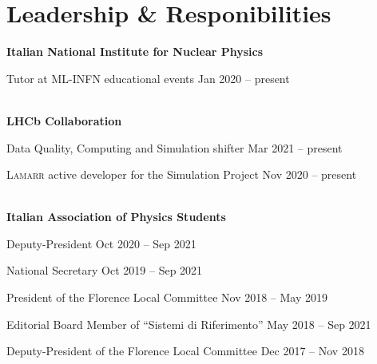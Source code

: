 \newcommand{\community}[1]
  {\normalsize \color{hlcolor-0} \textbf{#1}}
  
\newcommand{\comservice}[2]
  {{\normalsize \color{maincolor} #1} \hfill {\small \color{hlcolor-1} #2}}

\newcommand{\button}[2]
  {\normalsize \color{maincolor} \href{#1}{#2}}
  

\section*{Leadership \& Responibilities}
\begin{cvcontent}
  \community{Italian National Institute for Nuclear Physics}
  \button{https://home.infn.it}{\faGlobe}\\ [1mm]
  \begin{itemize*}[label=\textcolor{iconcolor}{\textbullet}]
    \item \comservice{Tutor at ML-INFN educational events}
      {Jan 2020 -- present}
  \end{itemize*}
  \\ [4mm]
  \community{LHCb Collaboration}
  \button{http://lhcb.web.cern.ch}{\faGlobe}\\ [1mm]
  \begin{itemize*}[label=\textcolor{iconcolor}{\textbullet}]
    \item \comservice{Data Quality, Computing and Simulation shifter}
      {Mar 2021 -- present}\\ [0.5mm]
    \item \comservice{\textsc{Lamarr} active developer for the Simulation Project}
      {Nov 2020 -- present}
  \end{itemize*}
  \\ [4mm]
  \community{Italian Association of Physics Students}
  \button{https://ai-sf.it}{\faGlobe}\\ [1mm]
  \begin{itemize*}[label=\textcolor{iconcolor}{\textbullet}]
    \item \comservice{Deputy-President}
      {Oct 2020 -- Sep 2021}\\ [0.5mm]
    \item \comservice{National Secretary}
      {Oct 2019 -- Sep 2021}\\ [0.5mm]
    \item \comservice{President of the Florence Local Committee}
      {Nov 2018 -- May 2019}\\ [0.5mm]
    \item \comservice{Editorial Board Member of ``Sistemi di Riferimento''}
      {May 2018 -- Sep 2021}\\ [0.5mm]
    \item \comservice{Deputy-President of the Florence Local Committee}
      {Dec 2017 -- Nov 2018}
  \end{itemize*}
\end{cvcontent}